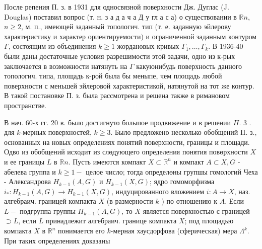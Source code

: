 \documentclass[10pt]{article}
\begin{document}
После репения П. з. в 1931 для односвязной поверхности Дж. Дуглас (J. Douglas) поставил вопрос (т. н. з а д а ч а Д у гл а с а) о существовании в $\mathbb{R} n$, $n \geqslant 2$, м. п., имеющей заданный топологич. тип (т. е. заданную эйлерову характеристику и характер ориентируемости) и ограниченной заданным контуром $\Gamma$, состоящим из объединения $k \geqslant 1$ жордановых кривых $\Gamma_{1}, \ldots, \Gamma_{k}$. В 1936-40 были даны достаточные условия разрешимости этой задачи, одно из к-рых заключается в возможности натянуть на $\Gamma$ какуюнибудь поверхность данного топологич. типа, площадь к-рой была бы меныпе, чем площадь любой поверхности с меньшей эйлеровой характеристикой, натянутой на тот же контур. В такой постановке П. з. была рассмотрена и решена также в римановом пространстве.



В нач. 60-х гг. 20 в. было достигнуто болыпое продвижение и в решении $\Pi$. 3 . для $k$-мерных поверхностей, $k \geqslant 3$. Было предложено несколько обобщений II. з., основанных на новых определениях понятий поверхности, границы и площади. Одво из обобщений исходит из слөдующего определения понятия повөрхности $X$ и ее границы $L$ в $\mathbb{R} n$. Пусть имеются компакт $X \subset \mathbb{R}^{n}$ и компакт $A \subset X, G$ - абелева группа и $k \geqslant 1-$ целое число; тогда определөны групшы гомологий Чеха - Александрова $H_{k-1}(A, G)$ и $H_{k-1}(X, G)$; ядро гомоморфизма $i_{*}: H_{k-1}(A, G) \rightarrow H_{k-1}(X, G)$, индуцированного вложением $i: A \rightarrow X$, наз. алгебраич. границей компакта $X$ (в размерности $k$ ) по отношению к $A$. Если $L-$ подгруппа группы $H_{k-1}(A, G)$, то $X$ является поверхностью с границей $\supset L$, если $L$ принадлежит алгебраич. границе компакта $X$; под площадью компакта $X$ в $\mathbb{R}^{n}$ понимается его $k$-мерная хаусдорфова (сферическая) мера $\Lambda^{k}$. При таких определениях доказаны
\end{document}
